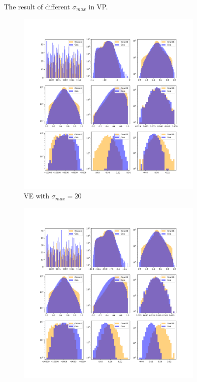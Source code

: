 \begin{figure}[htbp]
    \caption{The result of different $\sigma_{max}$ in VP.}
    \label{fig:vp_sigma_max}
\end{figure}


\begin{figure}[htbp]
    \centering
    \begin{subfigure}[b]{0.4\textwidth} %
        \includegraphics[width=\textwidth]{Figures/ve_20.png}
        \caption{VE with $\sigma_{max} = 20$}
        \label{fig:ve_20}
    \end{subfigure}
    \hspace{0.015\textwidth} %
    \begin{subfigure}[b]{0.4\textwidth}
        \includegraphics[width=\textwidth]{Figures/ve_10.png}

\end{subfigure}
\end{figure}
